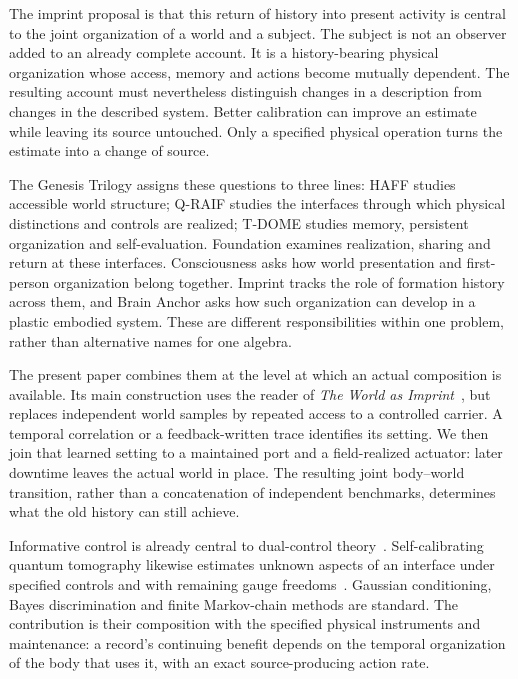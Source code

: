\documentclass[11pt,a4paper]{article}
\begin{document}
The imprint proposal is that this return of history into present activity is central to the joint organization of a world and a subject. The subject is not an observer added to an already complete account. It is a history-bearing physical organization whose access, memory and actions become mutually dependent. The resulting account must nevertheless distinguish changes in a description from changes in the described system. Better calibration can improve an estimate while leaving its source untouched. Only a specified physical operation turns the estimate into a change of source.

The Genesis Trilogy assigns these questions to three lines: HAFF studies accessible world structure; Q-RAIF studies the interfaces through which physical distinctions and controls are realized; T-DOME studies memory, persistent organization and self-evaluation. Foundation examines realization, sharing and return at these interfaces. Consciousness asks how world presentation and first-person organization belong together. Imprint tracks the role of formation history across them, and Brain Anchor asks how such organization can develop in a plastic embodied system. These are different responsibilities within one problem, rather than alternative names for one algebra.

The present paper combines them at the level at which an actual composition is available. Its main construction uses the reader of \emph{The World as Imprint}~\cite{WorldImprint}, but replaces independent world samples by repeated access to a controlled carrier. A temporal correlation or a feedback-written trace identifies its setting. We then join that learned setting to a maintained port and a field-realized actuator: later downtime leaves the actual world in place. The resulting joint body--world transition, rather than a concatenation of independent benchmarks, determines what the old history can still achieve.

Informative control is already central to dual-control theory~\cite{KlenskeHennig}. Self-calibrating quantum tomography likewise estimates unknown aspects of an interface under specified controls and with remaining gauge freedoms~\cite{Branczyk}. Gaussian conditioning, Bayes discrimination and finite Markov-chain methods are standard. The contribution is their composition with the specified physical instruments and maintenance: a record's continuing benefit depends on the temporal organization of the body that uses it, with an exact source-producing action rate.
\end{document}

